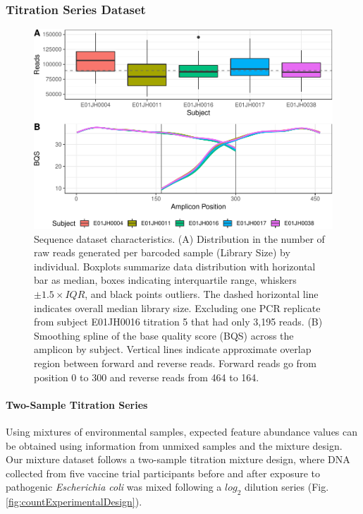 \documentclass[linenumbers]{bmcart}
\begin{document}
\subsubsection{Titration Series Dataset}
\begin{figure}
\centering
\includegraphics{qaPlots-1.pdf}
\caption{\label{fig:qaPlots}Sequence dataset characteristics. (A)
Distribution in the number of raw reads generated per barcoded sample (Library Size)
by individual. Boxplots summarize data distribution with horizontal bar
as median, boxes indicating interquartile range, whiskers
\(\pm 1.5\times IQR\), and black points outliers. The dashed horizontal
line indicates overall median library size. Excluding one PCR replicate
from subject E01JH0016 titration 5 that had only 3,195 reads. (B)
Smoothing spline of the base quality score (BQS) across the amplicon by
subject. Vertical lines indicate approximate overlap region between
forward and reverse reads. Forward reads go from position 0 to 300 and
reverse reads from 464 to 164.}
\end{figure}

\paragraph{Two-Sample Titration Series}
Using mixtures of environmental samples, expected feature abundance values can be obtained using information from unmixed samples and the mixture design.
Our mixture dataset follows a two-sample titration mixture design, where DNA collected from five vaccine trial participants before and
after exposure to pathogenic \emph{Escherichia coli}  was mixed following a \(log_2\) dilution series (Fig. \ref{fig:countExperimentalDesign}).
\end{document}
